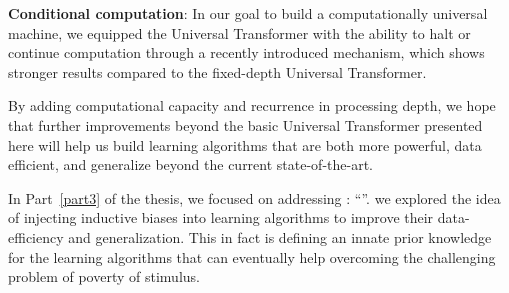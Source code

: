 \textbf{Conditional computation}: In our goal to build a computationally universal machine, we equipped the Universal Transformer with the ability to halt or continue computation through a recently introduced mechanism, which shows stronger results compared to the fixed-depth Universal Transformer.

By adding computational capacity and recurrence in processing depth, we hope that further improvements beyond the basic Universal Transformer presented here will help us build learning algorithms that are both more powerful, data efficient, and generalize beyond the current state-of-the-art.

In Part~\ref{part3} of the thesis, we focused on addressing \textbf{}: ``\emph{}''.
we explored the idea of injecting inductive biases into learning algorithms to improve their data-efficiency and generalization. This in fact is defining an innate prior knowledge for the learning algorithms that can eventually help overcoming the challenging problem of poverty of stimulus.

